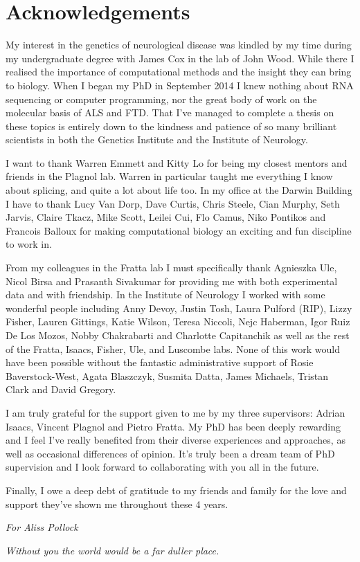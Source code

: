 \pagebreak
\clearpage

\section*{Acknowledgements}

My interest in the genetics of neurological disease was kindled by my time during my undergraduate degree with James Cox in the lab of John Wood.
While there I realised the importance of computational methods and the insight they can bring to biology.  
When I began my PhD in September 2014 I knew nothing about RNA sequencing or computer programming, nor the great body of work on the molecular basis of ALS and FTD. 
That I've managed to complete a thesis on these topics is entirely down to the kindness and patience of so many brilliant scientists in both the Genetics Institute and the Institute of Neurology.  

I want to thank Warren Emmett and Kitty Lo for being my closest mentors and friends in the Plagnol lab. 
Warren in particular taught me everything I know about splicing, and quite a lot about life too.
In my office at the Darwin Building I have to thank Lucy Van Dorp, Dave Curtis, Chris Steele, Cian Murphy, Seth Jarvis, Claire Tkacz, Mike Scott, Leilei Cui, Flo Camus, Niko Pontikos and Francois Balloux for making computational biology an exciting and fun discipline to work in.

From my colleagues in the Fratta lab I must specifically thank Agnieszka Ule, Nicol Birsa and Prasanth Sivakumar for providing me with both experimental data and with friendship.
In the Institute of Neurology I worked with some wonderful people including Anny Devoy, Justin Tosh, Laura Pulford (RIP), Lizzy Fisher, Lauren Gittings, Katie Wilson, Teresa Niccoli, Nejc Haberman, Igor Ruiz De Los Mozos, Nobby Chakrabarti and Charlotte Capitanchik as well as the rest of the Fratta, Isaacs, Fisher, Ule, and Luscombe labs.
None of this work would have been possible without the fantastic administrative support of Rosie Baverstock-West, Agata Blaszczyk, Susmita Datta, James Michaels, Tristan Clark and David Gregory.

I am truly grateful for the support given to me by my three supervisors: Adrian Isaacs, Vincent Plagnol and Pietro Fratta. 
My PhD has been deeply rewarding and I feel I've really benefited from their diverse experiences and approaches, as well as occasional differences of opinion.
It's truly been a dream team of PhD supervision and I look forward to collaborating with you all in the future.

Finally, I owe a deep debt of gratitude to my friends and family for the love and support they've shown me throughout these 4 years.\\
\vspace{50mm}

\begingroup
\centering
\textit{For Aliss Pollock}

\textit{Without you the world would be a far duller place.}


\endgroup